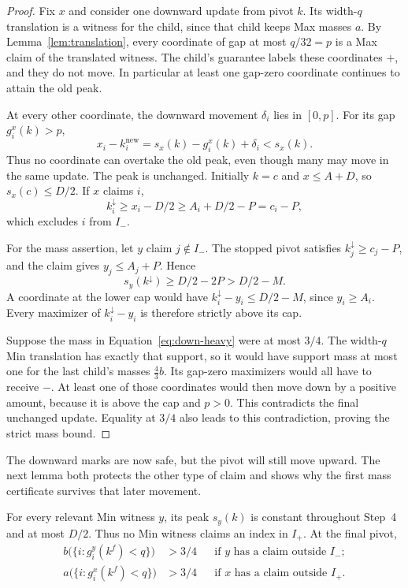 \begin{proof}
Fix $x$ and consider one downward update from pivot $k$. Its
width-$q$ translation is a witness for the child, since that child
keeps Max masses $a$. By Lemma~\ref{lem:translation}, every
coordinate of gap at most $q/32=p$ is a Max claim of the translated
witness. The child's guarantee labels these coordinates $+$, and
they do not move. In particular at least one gap-zero coordinate
continues to attain the old peak.

At every other coordinate, the downward movement $\delta_i$ lies
in $[0,p]$. For its gap $g_i^x(k)>p$,
\[
 x_i-k_i^{\mathrm{new}}
           =s_x(k)-g_i^x(k)+\delta_i<s_x(k).
\]
Thus no coordinate can overtake the old peak, even though many may
move in the same update. The peak is unchanged. Initially $k=c$
and $x\le A+D$, so $s_x(c)\le D/2$. If $x$ claims $i$,
\[
 k_i^{\downarrow}\ge x_i-D/2
                    \ge A_i+D/2-P=c_i-P,
\]
which excludes $i$ from $I_-$.

For the mass assertion, let $y$ claim $j\notin I_-$. The stopped
pivot satisfies $k_j^{\downarrow}\ge c_j-P$, and the claim gives
$y_j\le A_j+P$. Hence
\begin{equation}
 s_y(k^{\downarrow})\ge D/2-2P>D/2-M.
 \label{eq:down-uncapped}
\end{equation}
A coordinate at the lower cap would have
$k_i^{\downarrow}-y_i\le D/2-M$, since $y_i\ge A_i$.
Every maximizer of $k_i^{\downarrow}-y_i$ is therefore strictly
above its cap.

Suppose the mass in Equation~\eqref{eq:down-heavy} were at most
$3/4$. The width-$q$ Min translation has exactly that support, so
it would have support mass at most one for the last child's masses
$\frac43 b$. Its gap-zero maximizers would all have to receive
$-$. At least one of those coordinates would then move down by a
positive amount, because it is above the cap and $p>0$. This
contradicts the final unchanged update. Equality at $3/4$ also
leads to this contradiction, proving the strict mass bound.
\end{proof}

The downward marks are now safe, but the pivot will still move upward.
The next lemma both protects the other type of claim and shows why the
first mass certificate survives that later movement.

\begin{lemma}
\label{lem:up}
For every relevant Min witness $y$, its peak $s_y(k)$ is constant
throughout Step~4 and at most $D/2$. Thus no Min witness claims an
index in $I_+$. At the final pivot,
\begin{align}
 b\bigl(\{i:g_i^y(k^f)<q\}\bigr)&>3/4
   &&\text{if }y\text{ has a claim outside }I_-;
   \label{eq:final-min-heavy}\\
 a\bigl(\{i:g_i^x(k^f)<q\}\bigr)&>3/4
   &&\text{if }x\text{ has a claim outside }I_+.
   \label{eq:final-max-heavy}
\end{align}
\end{lemma}

